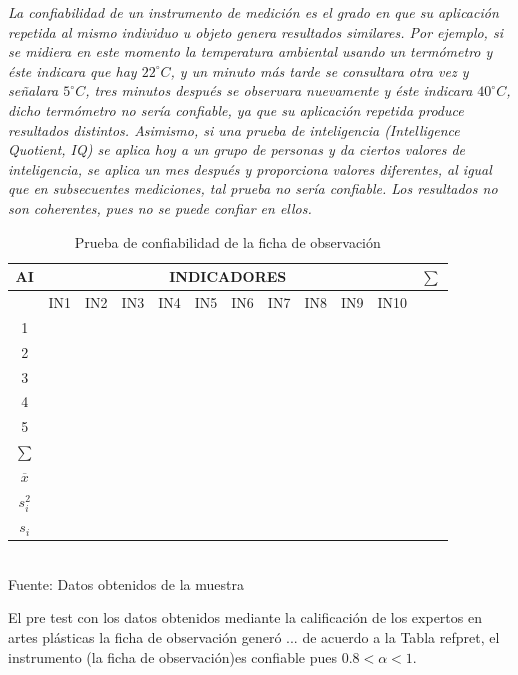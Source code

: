 \documentclass[12pt,a4paper]{article}
\begin{document}
\begin{displayquote}
\emph{La confiabilidad de un instrumento de medición es el grado en que su aplicación
repetida al mismo individuo u objeto genera resultados similares. Por ejemplo, si se midiera en este momento la temperatura ambiental usando un termómetro y éste indicara que hay $22^\circ C$, y un minuto más tarde se consultara otra vez y señalara $5^\circ C$, tres minutos después se observara nuevamente y éste indicara $40^\circ C$, dicho termómetro no sería confiable, ya que su aplicación repetida produce resultados distintos. Asimismo, si una prueba de inteligencia (Intelligence Quotient, IQ) se aplica hoy a un grupo de personas y da ciertos valores de inteligencia, se aplica un mes después y proporciona valores diferentes, al igual que en subsecuentes mediciones, tal prueba no sería confiable. Los resultados no son coherentes, pues no se puede confiar en ellos.
} \cite[p.~61]{inv1}\end{displayquote}

\begin{table}[ht!]
{%
\caption{Prueba de confiabilidad de la ficha de observación}\label{pret:1}
\begin{tabular}{cccccccccccc}\Xhline{2pt}
AI&\multicolumn{10}{c}{INDICADORES}&$\sum$\\\midrule
&IN1&IN2&IN3&IN4&IN5&IN6&IN7&IN8&IN9&IN10&\\\cline{2-11}
1 &&&&&&&&&&&\\
2 &&&&&&&&&&&\\
3 &&&&&&&&&&&\\
4 &&&&&&&&&&&\\
5 &&&&&&&&&&&\\\midrule
$\sum$         &&&&&&&&&&&\\
$\overline{x}$ &&&&&&&&&&&\\
$s_i^2$        &&&&&&&&&&&\\
$s_i$          &&&&&&&&&&&\\\bottomrule
\end{tabular}\\\vspace{0.5cm}
{\normalsize Fuente: Datos obtenidos de la muestra}
}
\end{table}


El pre test con los datos obtenidos mediante la calificación de los expertos en artes plásticas la ficha de observación generó ... de acuerdo a la Tabla ref{pret}, el instrumento (la ficha de observación)es confiable pues $0.8<\alpha<1$.
\end{document}
